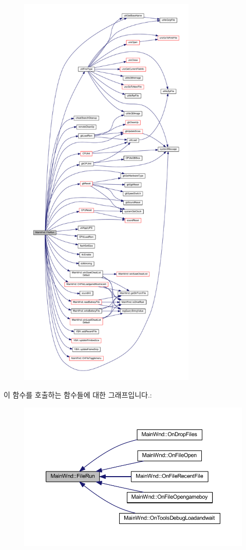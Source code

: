 \begin{figure}[H]
\begin{center}
\leavevmode
\includegraphics[height=550pt]{class_main_wnd_a946cd4793215a424eb736af418ccbc3d_cgraph}
\end{center}
\end{figure}
이 함수를 호출하는 함수들에 대한 그래프입니다.\+:
\nopagebreak
\begin{figure}[H]
\begin{center}
\leavevmode
\includegraphics[width=350pt]{class_main_wnd_a946cd4793215a424eb736af418ccbc3d_icgraph}
\end{center}
\end{figure}
